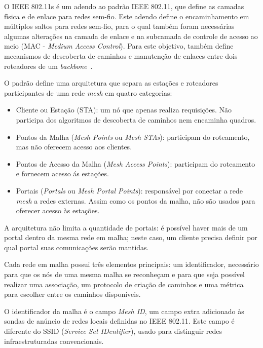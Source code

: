 \documentclass[letterpaper, 10 pt, conference]{ieeeconf}  %
\begin{document}
O IEEE 802.11s é um adendo ao padrão IEEE 802.11, que define as camadas física e de enlace para redes sem-fio. Este adendo define o encaminhamento em múltiplos saltos para redes sem-fio, para o qual também foram necessárias algumas alterações na camada de enlace e na subcamada de controle de acesso ao meio (MAC - \textit{Medium Access Control}). Para este objetivo, também define mecanismos de descoberta de caminhos e manutenção de enlaces entre dois roteadores de um \textit{backbone}~\cite{carrano2011,hiertz2010,andreev2010}.

O padrão define uma arquitetura que separa as estações e roteadores participantes de uma rede \textit{mesh} em quatro categorias:

\begin{itemize}

	\item Cliente ou Estação (STA): um nó que apenas realiza requisições. Não participa dos algoritmos de descoberta de caminhos nem encaminha quadros.
    
    \item Pontos da Malha (\textit{Mesh Points} ou \textit{Mesh STAs}): participam do roteamento, mas não oferecem acesso aos clientes.
    
    \item Pontos de Acesso da Malha (\textit{Mesh Access Points}): participam do roteamento e fornecem acesso ás estações.
    
    \item Portais (\textit{Portals} ou \textit{Mesh Portal Points}): responsável por conectar a rede \textit{mesh} a redes externas. Assim como os pontos da malha, não são usados para oferecer acesso às estações.

\end{itemize}

A arquitetura não limita a quantidade de portais: é possível haver mais de um portal dentro da mesma rede em malha; neste caso, um cliente precisa definir por qual portal suas comunicações serão mantidas.

Cada rede em malha possui três elementos principais: um identificador, necessário para que os nós de uma mesma malha se reconheçam e para que seja possível realizar uma associação, um protocolo de criação de caminhos e uma métrica para escolher entre os caminhos disponíveis.

O identificador da malha é o campo \textit{Mesh ID}, um campo extra adicionado às sondas de anúncio de redes locais definidas no IEEE 802.11. Este campo é diferente do SSID (\textit{Service Set IDentifier}), usado para distinguir redes infraestruturadas convencionais.
\end{document}
